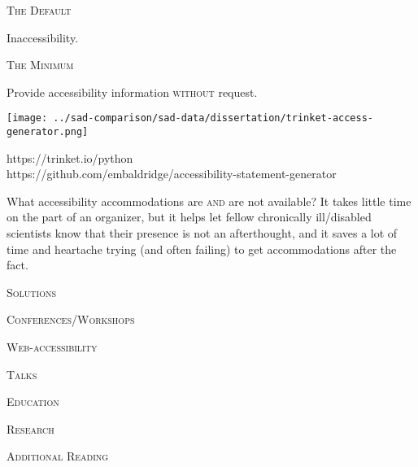 \documentclass{beamer}
\begin{document}
\begin{flushright}
\begin{minipage}{0.25\linewidth}
\begin{Large}
\textsc{The Default}
\begin{center}
Inaccessibility.
\end{center}
\end{Large}
\begin{Large}
\textsc{The Minimum}\\
\end{Large}
Provide accessibility information \textsc{without} request.\\
\begin{center}
\texttt{[image: ../sad-comparison/sad-data/dissertation/trinket-access-generator.png]}\\
\begin{small}
https://trinket.io/python\\
https://github.com/embaldridge/accessibility-statement-generator\\
\end{small}
\end{center}
What accessibility accommodations are \textsc{and} are not available?  It takes little time on the part of an organizer, but it helps let fellow chronically ill/disabled scientists know that their presence is not an afterthought, and it saves a lot of time and heartache trying (and often failing) to get accommodations after the fact.
\end{minipage}
\begin{minipage}{0.42\linewidth}
\begin{Large}
\begin{center}
\textsc{Solutions}
\end{center}
\end{Large}
\begin{Large}
\textsc{Conferences/Workshops\\}
\end{Large}
\begin{Large}
\textsc{Web-accessibility\\}
\end{Large}
\begin{Large}
\textsc{Talks\\}
\end{Large}
\begin{Large}
\textsc{Education\\}
\end{Large}
\begin{Large}
\textsc{Research\\}
\end{Large}
\end{minipage}
\begin{minipage}{0.25\linewidth}
\begin{Large}
\textsc{Additional Reading}
\end{Large}
\end{minipage}
\end{flushright}
\end{document}

